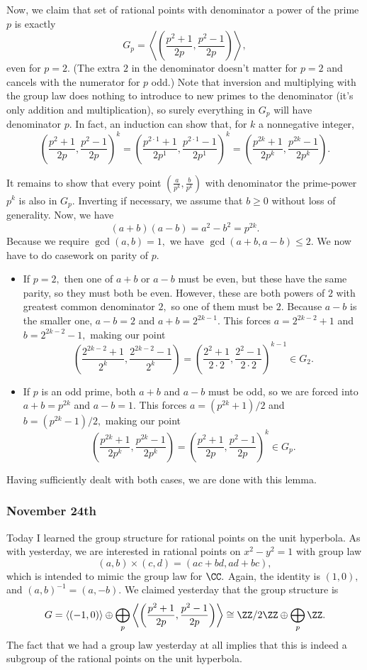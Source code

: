 Now, we claim that set of rational points with denominator a power of the prime $p$ is exactly
\[G_p=\left\langle\left(\frac{p^2+1}{2p},\frac{p^2-1}{2p}\right)\right\rangle,\]
even for $p=2.$ (The extra $2$ in the denominator doesn't matter for $p=2$ and cancels with the numerator for $p$ odd.) Note that inversion and multiplying with the group law does nothing to introduce to new primes to the denominator (it's only addition and multiplication), so surely everything in $G_p$ will have denominator $p.$ In fact, an induction can show that, for $k$ a nonnegative integer,
\[\left(\frac{p^2+1}{2p},\frac{p^2-1}{2p}\right)^k=\left(\frac{p^{2\cdot1}+1}{2p^1},\frac{p^{2\cdot1}-1}{2p^1}\right)^k=\left(\frac{p^{2k}+1}{2p^k},\frac{p^{2k}-1}{2p^k}\right).\]

It remains to show that every point $\left(\frac a{p^k},\frac b{p^k}\right)$ with denominator the prime-power $p^k$ is also in $G_p.$ Inverting if necessary, we assume that $b\ge0$ without loss of generality. Now, we have
\[(a+b)(a-b)=a^2-b^2=p^{2k}.\]
Because we require $\gcd(a,b)=1,$ we have $\gcd(a+b,a-b)\le2.$ We now have to do casework on parity of $p.$
\begin{itemize}
    \item If $p=2,$ then one of $a+b$ or $a-b$ must be even, but these have the same parity, so they must both be even. However, these are both powers of $2$ with greatest common denominator $2,$ so one of them must be $2.$ Because $a-b$ is the smaller one, $a-b=2$ and $a+b=2^{2k-1}.$ This forces $a=2^{2k-2}+1$ and $b=2^{2k-2}-1,$ making our point
    \[\left(\frac{2^{2k-2}+1}{2^k},\frac{2^{2k-2}-1}{2^k}\right)=\left(\frac{2^2+1}{2\cdot2},\frac{2^2-1}{2\cdot2}\right)^{k-1}\in G_2.\]
    
    \item If $p$ is an odd prime, both $a+b$ and $a-b$ must be odd, so we are forced into $a+b=p^{2k}$ and $a-b=1.$ This forces $a=\left(p^{2k}+1\right)/2$ and $b=\left(p^{2k}-1\right)/2,$ making our point
    \[\left(\frac{p^{2k}+1}{2p^k},\frac{p^{2k}-1}{2p^k}\right)=\left(\frac{p^2+1}{2p},\frac{p^2-1}{2p}\right)^k\in G_p.\]
\end{itemize}
Having sufficiently dealt with both cases, we are done with this lemma.

\subsubsection{November 24th}
Today I learned the group structure for rational points on the unit hyperbola. As with yesterday, we are interested in rational points on $x^2-y^2=1$ with group law
\[(a,b)\times(c,d)=(ac+bd,ad+bc),\]
which is intended to mimic the group law for $\CC.$ Again, the identity is $(1,0),$ and $(a,b)^{-1}=(a,-b).$ We claimed yesterday that the group structure is
\[G=\langle(-1,0)\rangle\oplus\bigoplus_p\left\langle\left(\frac{p^2+1}{2p},\frac{p^2-1}{2p}\right)\right\rangle\cong\ZZ/2\ZZ\oplus\bigoplus_p\ZZ.\]
The fact that we had a group law yesterday at all implies that this is indeed a subgroup of the rational points on the unit hyperbola.

